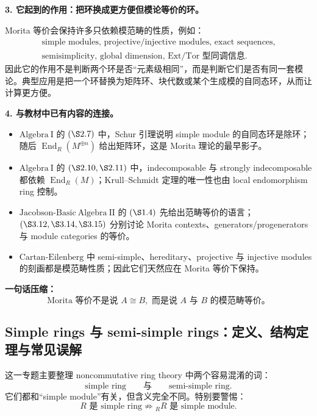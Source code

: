 \documentclass[a4paper]{ctexart}
\theoremstyle{definition}
\theoremstyle{analysis}
\theoremstyle{plain}
\begin{document}
\medskip

\textbf{3. 它起到的作用：把环换成更方便但模论等价的环。}

Morita 等价会保持许多只依赖模范畴的性质，例如：
\[
\begin{array}{c}
  \text{simple modules,\ projective/injective modules,\ exact sequences,}\\
  \text{semisimplicity,\ global dimension,\ Ext/Tor 型同调信息}.
\end{array}
\]
因此它的作用不是判断两个环是否“元素级相同”，而是判断它们是否有同一套模论。典型应用是把一个环替换为矩阵环、块代数或某个生成模的自同态环，从而让计算更方便。

\medskip

\textbf{4. 与教材中已有内容的连接。}

\begin{itemize}
  \item \(\mathrm{Algebra\ I}\) 的 \((\S 2.7)\) 中，Schur 引理说明 simple module 的自同态环是除环；随后 \(\operatorname{End}_R(M^{\oplus n})\) 给出矩阵环，这是 Morita 理论的最早影子。
  \item \(\mathrm{Algebra\ I}\) 的 \((\S 2.10,\S 2.11)\) 中，indecomposable 与 strongly indecomposable 都依赖 \(\operatorname{End}_R(M)\)；Krull--Schmidt 定理的唯一性也由 local endomorphism ring 控制。
  \item \(\mathrm{Jacobson\text{-}Basic\ Algebra\ II}\) 的 \((\S 1.4)\) 先给出范畴等价的语言；\((\S 3.12,\S 3.14,\S 3.15)\) 分别讨论 Morita contexts、generators/progenerators 与 module categories 的等价。
  \item \(\mathrm{Cartan\text{-}Eilenberg}\) 中 semi-simple、hereditary、projective 与 injective modules 的刻画都是模范畴性质；因此它们天然应在 Morita 等价下保持。
\end{itemize}

\medskip

\textbf{一句话压缩：}
\[
  \boxed{
    \text{Morita 等价不是说 }A\cong B,\text{ 而是说 }A\text{ 与 }B\text{ 的模范畴等价。}
  }
\]

\subsection{\texorpdfstring{Simple rings 与 semi-simple rings：定义、结构定理与常见误解}{Simple rings 与 semi-simple rings}}\label{subsec:topic-simple-semisimple-rings}

这一专题主要整理 noncommutative ring theory 中两个容易混淆的词：
\[
  \text{simple ring}
  \qquad\text{与}\qquad
  \text{semi-simple ring}.
\]
它们都和“simple module”有关，但含义完全不同。特别要警惕：
\[
  R\text{ 是 simple ring}
  \not\Rightarrow
  {}_RR\text{ 是 simple module}.
\]
\end{document}
